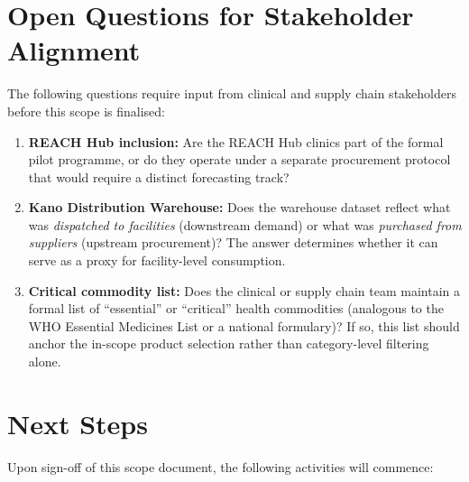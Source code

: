 \documentclass[12pt, a4paper]{article}
\begin{document}
\section{Open Questions for Stakeholder Alignment}

The following questions require input from clinical and supply chain
stakeholders before this scope is finalised:

\begin{enumerate}[leftmargin=1.5em, itemsep=6pt]
  \item \textbf{REACH Hub inclusion:} Are the REACH Hub clinics part of the
        formal pilot programme, or do they operate under a separate
        procurement protocol that would require a distinct forecasting track?

  \item \textbf{Kano Distribution Warehouse:} Does the warehouse dataset
        reflect what was \textit{dispatched to facilities} (downstream demand)
        or what was \textit{purchased from suppliers} (upstream procurement)?
        The answer determines whether it can serve as a proxy for facility-level
        consumption.

  \item \textbf{Critical commodity list:} Does the clinical or supply chain
        team maintain a formal list of ``essential'' or ``critical'' health
        commodities (analogous to the WHO Essential Medicines List or a
        national formulary)? If so, this list should anchor the in-scope
        product selection rather than category-level filtering alone.
\end{enumerate}

\section{Next Steps}

Upon sign-off of this scope document, the following activities will commence:
\end{document}
